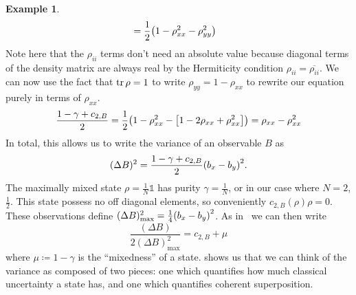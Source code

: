 \documentclass[11pt,english]{article}
\theoremstyle{definition}
\newtheorem{example}{Example}[section]
\newcommand{\twonorm}[1][\rho]{c_{2,B} (#1)}
\newcommand{\twonormE}[1][\rho]{c_{2,B}}
\begin{document}
\begin{example}
\begin{align*}
		                                 & = \frac{1}{2}\qty(1 - \rho_{xx}^2 - \rho_{yy}^2)
	\end{align*}
	Note here that the $\rho_{ii}$ terms don't need an absolute value because diagonal terms of the density matrix are always real by the Hermiticity condition $\rho_{ii} = \overline{\rho_{ii}}$.
	We can now use the fact that $\tr\rho = 1$ to write $\rho_{yy} = 1 - \rho_{xx}$ to rewrite our equation purely in terms of $\rho_{xx}$.
	\begin{equation*}
		\frac{1 - \gamma + \twonormE}{2} =\frac{1}{2}\qty(1 - \rho_{xx}^2 - \qty[1 - 2\rho_{xx} + \rho_{xx}^2]) = \rho_{xx} - \rho_{xx}^2
	\end{equation*}
	In total, this allows us to write the variance of an observable $B$ as
	\begin{equation*}
		(\Delta B)^2 = \frac{1 - \gamma + \twonormE}{2}\qty(b_x - b_y)^2.
	\end{equation*}
	The maximally mixed state $\rho = \frac{1}{N}\mathbb{1}$ has purity $\gamma = \frac{1}{N}$, or in our case where $N = 2$, $\frac{1}{2}$. This state possess no off diagonal elements, so conveniently $\twonorm{\rho} = 0$. These observations define $(\Delta B)_\text{max}^2 = \frac{1}{4}\qty(b_x - b_y)^2$. As in~\cite{dynamic-entropies} we can then write
	\begin{equation}\label{eq:variance-max}
		\frac{(\Delta B)}{2(\Delta B)_\text{max}^2} = \twonormE + \mu
	\end{equation}
	where $\mu\coloneqq 1 - \gamma$ is the ``mixedness'' of a state.  shows us that we can think of the variance as composed of two pieces: one which quantifies how much classical uncertainty a state has, and one which quantifies coherent superposition.
\end{example}
\end{document}
